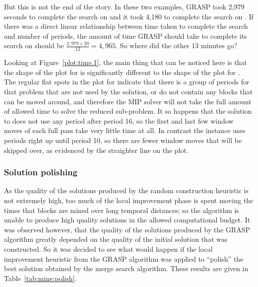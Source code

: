 \documentclass[journal]{IEEEtran}
\begin{document}
But this is not the end of the story. In these two examples, GRASP took 2,979 seconds to complete the search on \dmine{} and it took 4,180 to complete the search on \zucksmall{}. If there was a direct linear relationship between time taken to complete the search and number of periods, the amount of time GRASP should take to complete its search on \zucksmall{} should be \(\frac{2,979\times20}{12} = 4,965\). So where did the other 13 minutes go?

Looking at Figure~\ref{plot:time.1}, the main thing that can be noticed here is that the shape of the plot for \zucksmall{} is significantly different to the shape of the plot for \dmine{}. The regular flat spots in the plot for \zucksmall{} indicate that there is a group of periods for that problem that are not used by the solution, or do not contain any blocks that can be moved around, and therefore the MIP solver will not take the full amount of allowed time to solve the reduced sub-problem. It so happens that the solution to \zucksmall{} does not use any period after period 16, so the first and last few window moves of each full pass take very little time at all. In contrast the \dmine{} instance uses periods right up until period 10, so there are fewer window moves that will be skipped over, as evidenced by the straighter line on the plot.

\subsubsection*{Solution polishing}

As the quality of the solutions produced by the random construction heuristic is not extremely high, too much of the local improvement phase is spent moving the times that blocks are mined over long temporal distances; so the algorithm is unable to produce high quality solutions in the allowed computational budget. It was observed however, that the quality of the solutions produced by the GRASP algorithm greatly depended on the quality of the initial solution that was constructed. So it was decided to see what would happen if the local improvement heuristic from the GRASP algorithm was applied to ``polish'' the best solution obtained by the merge search algorithm. These results are given in Table~\ref{tab:mine:polish}.
\end{document}
